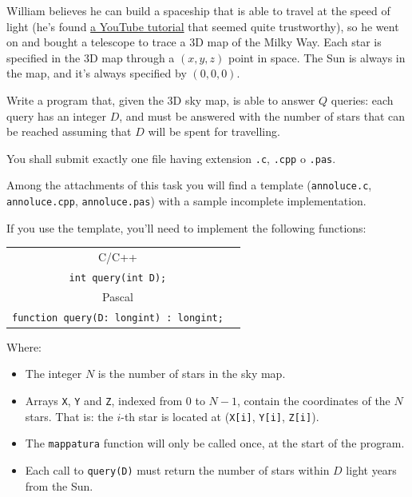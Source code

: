   William believes he can build a spaceship that is able to travel at the speed of light (he's found \href{https://www.youtube.com/watch?v=dQw4w9WgXcQ}{a YouTube tutorial} that seemed quite trustworthy), so he went on and bought a telescope to trace a 3D map of the Milky Way. Each star is specified in the 3D map through a $(x, y, z)$ point in space. The Sun is always in the map, and it's always specified by $(0, 0, 0)$.

  Write a program that, given the 3D sky map, is able to answer $Q$ queries: each query has an integer $D$, and must be answered with the number of stars that can be reached assuming that $D$ will be spent for travelling.

\Implementation
You shall submit exactly one file having extension \texttt{.c}, \texttt{.cpp} o \texttt{.pas}.

\begin{warning}
Among the attachments of this task you will find a template (\texttt{annoluce.c}, \texttt{annoluce.cpp}, \texttt{annoluce.pas}) with a sample incomplete implementation.
\end{warning}

If you use the template, you'll need to implement the following functions:
\begin{center}\begin{tabularx}{\textwidth}{|c|X|}
\hline
C/C++  & \begin{tabular}[x]{@{}@{}}\verb|void mappatura(int N, int X[], int Y[], int Z[]);|\\ \verb|int query(int D);|\end{tabular}\\
\hline
Pascal & \begin{tabular}[x]{@{}@{}}\verb|procedure mappatura(N: longint; var X, Y, Z: array of longint);|\\ \verb|function query(D: longint) : longint;|\end{tabular}\\
\hline
\end{tabularx}\end{center}
Where:
\begin{itemize}[nolistsep]
  \item The integer $N$ is the number of stars in the sky map.
  \item Arrays \texttt{X}, \texttt{Y} and \texttt{Z}, indexed from $0$ to $N-1$, contain the coordinates of the $N$ stars. That is: the $i$-th star is located at (\texttt{X[i]}, \texttt{Y[i]}, \texttt{Z[i]}).
  \item The \texttt{mappatura} function will only be called once, at the start of the program.
  \item Each call to \texttt{query(D)} must return the number of stars within $D$ light years from the Sun.
\end{itemize}

